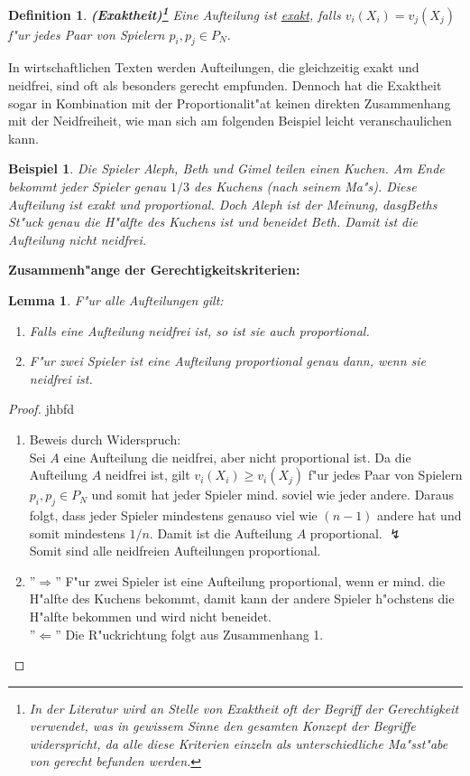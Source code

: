 \documentclass[11pt, a4paper, twoside]{article}
\newcommand{\wf}{\color{white}}
\newcommand{\tf}{\color{black}}
\newtheorem{defi}[satz]{Definition}
\newtheorem{bsp}[satz]{Beispiel}
\newtheorem{lem}[satz]{Lemma}
\numberwithin{equation}{section}
\begin{document}
\begin{defi}{\textbf{(Exaktheit)\footnote{In der Literatur wird an Stelle von Exaktheit oft der Begriff der Gerechtigkeit verwendet, was in gewissem Sinne den gesamten Konzept der Begriffe widerspricht, da alle diese Kriterien einzeln als unterschiedliche Ma"sst"abe von gerecht befunden werden.}}}
\newline Eine Aufteilung ist \underline{exakt}, falls $v_i(X_i) = v_j(X_j)$ f"ur jedes Paar von Spielern $p_i, p_j \in P_N$.
\end{defi}
In wirtschaftlichen Texten werden Aufteilungen, die gleichzeitig exakt und neidfrei, sind oft als besonders gerecht empfunden. Dennoch hat die Exaktheit sogar in Kombination mit der Proportionalit"at keinen direkten Zusammenhang mit der Neidfreiheit, wie man sich am folgenden Beispiel leicht veranschaulichen kann.\\
\begin{bsp}Die Spieler Aleph, Beth und Gimel teilen einen Kuchen. Am Ende bekommt jeder Spieler genau $1/3$ des Kuchens (nach seinem Ma"s). Diese Aufteilung ist exakt und proportional. Doch Aleph ist der Meinung, dasgBeths St"uck genau die H"alfte des Kuchens ist und beneidet Beth. Damit ist die Aufteilung nicht neidfrei.\end{bsp}
\textbf{Zusammenh"ange der Gerechtigkeitskriterien:}
\begin{lem}
F"ur alle Aufteilungen gilt:
\begin{enumerate}
\item Falls eine Aufteilung neidfrei ist, so ist sie auch proportional.
\item F"ur zwei Spieler ist eine Aufteilung proportional genau dann, wenn sie neidfrei ist.
\end{enumerate}
\end{lem}
\begin{proof}\wf jhbfd \tf
\begin{enumerate}
\item Beweis durch Widerspruch:\\ Sei $A$ eine Aufteilung die neidfrei, aber nicht proportional ist. Da die Aufteilung $A$ neidfrei ist, gilt $v_i(X_i) \geq v_i(X_j)$ f"ur jedes Paar von Spielern $p_i, p_j \in P_N$ und somit hat jeder Spieler mind. soviel wie jeder andere. Daraus folgt, dass jeder Spieler mindestens genauso viel wie $(n-1)$ andere hat und somit mindestens $1/n$. Damit ist die Aufteilung $A$ proportional. $\lightning$\\Somit sind alle neidfreien Aufteilungen proportional.
\item ''$\Rightarrow$'' F"ur zwei Spieler ist eine Aufteilung proportional, wenn er mind. die H"alfte des Kuchens bekommt, damit kann der andere Spieler h"ochstens die H"alfte bekommen und wird nicht beneidet.\\ ''$\Leftarrow$'' Die R"uckrichtung folgt aus Zusammenhang 1.\\
\end{enumerate}
\end{proof}
\end{document}
